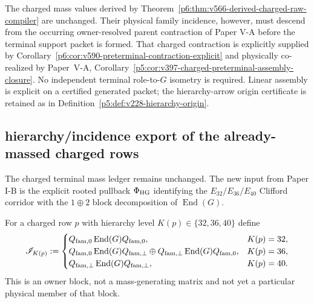 \documentclass[12pt,a4paper]{article}
\begin{document}
\begin{corollary}
\label{p6:cor:v588-charged-compiler-chronology}
The charged mass values derived by
Theorem~\ref{p6:thm:v566-derived-charged-raw-compiler} are unchanged.  Their
physical family incidence, however, must descend from the occurring
owner-resolved parent contraction of Paper V-A before the terminal support
packet is formed.  That charged contraction is explicitly supplied by
Corollary~\ref{p6:cor:v590-preterminal-contraction-explicit} and physically
co-realized by Paper~V-A,
Corollary~\ref{p5:cor:v397-charged-preterminal-assembly-closure}.
No independent terminal role-to-$G$ isometry is required. Linear
assembly is explicit on a certified generated packet; the hierarchy-arrow
origin certificate is retained as in
Definition~\ref{p5:def:v228-hierarchy-origin}.
\end{corollary}

\subsection*{hierarchy/incidence export of the already-massed charged rows}
\label{p6:sec:v589-hierarchy-incidence-export}
The charged terminal mass ledger remains unchanged.  The new input from Paper
I-B is the explicit rooted pullback $\Phi_{\rm HG}$ identifying the
$E_{32}/E_{36}/E_{40}$ Clifford corridor with the $1\oplus2$ block
decomposition of $\operatorname{End}(G)$.

\begin{definition}
\label{p6:def:v589-hierarchy-incidence-block}
For a charged row $p$ with hierarchy level $K(p)\in\{32,36,40\}$ define
\[
 \mathscr I_{K(p)}:=
 \begin{cases}
 Q_{\rm fam,0}\operatorname{End}(G)Q_{\rm fam,0},&K(p)=32,\\
 Q_{\rm fam,0}\operatorname{End}(G)Q_{\rm fam,\perp}
 \oplus Q_{\rm fam,\perp}\operatorname{End}(G)Q_{\rm fam,0},&K(p)=36,\\
 Q_{\rm fam,\perp}\operatorname{End}(G)Q_{\rm fam,\perp},&K(p)=40.
 \end{cases}
\]
This is an owner block, not a mass-generating matrix and not yet a particular
physical member of that block.
\end{definition}
\end{document}
